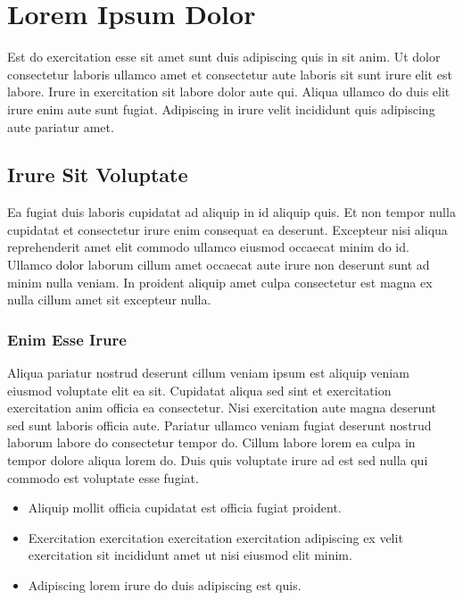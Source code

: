 \documentclass[
]{article}
\author{}
\date{}
\providecommand{\tightlist}{%
  \setlength{\itemsep}{0pt}\setlength{\parskip}{0pt}}
\begin{document}
\section{Lorem Ipsum Dolor}\label{lorem-ipsum-dolor}

Est do exercitation esse sit amet sunt duis adipiscing quis in sit anim.
Ut dolor consectetur laboris ullamco amet et consectetur aute laboris
sit sunt irure elit est labore. Irure in exercitation sit labore dolor
aute qui. Aliqua ullamco do duis elit irure enim aute sunt fugiat.
Adipiscing in irure velit incididunt quis adipiscing aute pariatur amet.

\subsection{Irure Sit Voluptate}\label{irure-sit-voluptate}

Ea fugiat duis laboris cupidatat ad aliquip in id aliquip quis. Et non
tempor nulla cupidatat et consectetur irure enim consequat ea deserunt.
Excepteur nisi aliqua reprehenderit amet elit commodo ullamco eiusmod
occaecat minim do id. Ullamco dolor laborum cillum amet occaecat aute
irure non deserunt sunt ad minim nulla veniam. In proident aliquip amet
culpa consectetur est magna ex nulla cillum amet sit excepteur nulla.

\subsubsection{Enim Esse Irure}\label{enim-esse-irure}

Aliqua pariatur nostrud deserunt cillum veniam ipsum est aliquip veniam
eiusmod voluptate elit ea sit. Cupidatat aliqua sed sint et exercitation
exercitation anim officia ea consectetur. Nisi exercitation aute magna
deserunt sed sunt laboris officia aute. Pariatur ullamco veniam fugiat
deserunt nostrud laborum labore do consectetur tempor do. Cillum labore
lorem ea culpa in tempor dolore aliqua lorem do. Duis quis voluptate
irure ad est sed nulla qui commodo est voluptate esse fugiat.

\begin{itemize}
\tightlist
\item
  Aliquip mollit officia cupidatat est officia fugiat proident.
\item
  Exercitation exercitation exercitation exercitation adipiscing ex
  velit exercitation sit incididunt amet ut nisi eiusmod elit minim.
\item
  Adipiscing lorem irure do duis adipiscing est quis.
\end{itemize}
\end{document}
